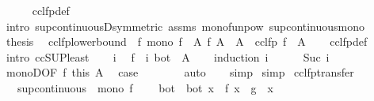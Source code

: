\begin{isabellebody}
\ \ \ \ \isamarkupfalse%
\ cclfp{\isacharunderscore}def\isanewline
\ \ \ \ \isamarkupfalse%
\ {\isacharparenleft}intro\ sup{\isacharunderscore}continuousD{\isacharbrackleft}symmetric{\isacharbrackright}\ assms\ mono{\isacharunderscore}funpow\ sup{\isacharunderscore}continuous{\isacharunderscore}mono{\isacharparenright}\isanewline
\ \ \isamarkupfalse%
\ \isamarkupfalse%
\ {\isacharquery}thesis\ \isacommand{{\isachardot}}\isamarkupfalse%
\isanewline
{}\isamarkupfalse%
%
\endisatagproof
{\isafoldproof}%
%
\isadelimproof
\isanewline
%
\endisadelimproof
\isanewline
{}\isamarkupfalse%
\ cclfp{\isacharunderscore}lowerbound{\isacharcolon}\ \ f{\isacharcolon}\ {\isachardoublequoteopen}mono\ f{\isachardoublequoteclose}\ \ A{\isacharcolon}\ {\isachardoublequoteopen}f\ A\ {\isasymle}\ A{\isachardoublequoteclose}\ \ {\isachardoublequoteopen}cclfp\ f\ {\isasymle}\ A{\isachardoublequoteclose}\isanewline
%
\isadelimproof
\ \ %
\endisadelimproof
%
\isatagproof
{}\isamarkupfalse%
\ cclfp{\isacharunderscore}def\isanewline
{}\isamarkupfalse%
\ {\isacharparenleft}intro\ ccSUP{\isacharunderscore}least{\isacharparenright}\isanewline
\ \ \isamarkupfalse%
\ i\ \isamarkupfalse%
\ {\isachardoublequoteopen}{\isacharparenleft}f\ {\isacharcircum}{\isacharcircum}\ i{\isacharparenright}\ bot\ {\isasymle}\ A{\isachardoublequoteclose}\isanewline
\ \ \isamarkupfalse%
\ {\isacharparenleft}induction\ i{\isacharparenright}\isanewline
\ \ \ \ \isamarkupfalse%
\ {\isacharparenleft}Suc\ i{\isacharparenright}\ \isamarkupfalse%
\ monoD{\isacharbrackleft}OF\ f\ this{\isacharbrackright}\ A\ \isamarkupfalse%
\ {\isacharquery}case\isanewline
\ \ \ \ \ \ \isamarkupfalse%
\ auto\isanewline
\ \ \isamarkupfalse%
\ simp\isanewline
{}\isamarkupfalse%
\ simp%
\endisatagproof
{\isafoldproof}%
%
\isadelimproof
\isanewline
%
\endisadelimproof
\isanewline
{}\isamarkupfalse%
\ cclfp{\isacharunderscore}transfer{\isacharcolon}\isanewline
\ \ \ {\isachardoublequoteopen}sup{\isacharunderscore}continuous\ {\isasymalpha}{\isachardoublequoteclose}\ {\isachardoublequoteopen}mono\ f{\isachardoublequoteclose}\isanewline
\ \ \ {\isachardoublequoteopen}{\isasymalpha}\ bot\ {\isacharequal}\ bot{\isachardoublequoteclose}\ {\isachardoublequoteopen}{\isasymAnd}x{\isachardot}\ {\isasymalpha}\ {\isacharparenleft}f\ x{\isacharparenright}\ {\isacharequal}\ g\ {\isacharparenleft}{\isasymalpha}\ x{\isacharparenright}{\isachardoublequoteclose}\isanewline

\end{isabellebody}
